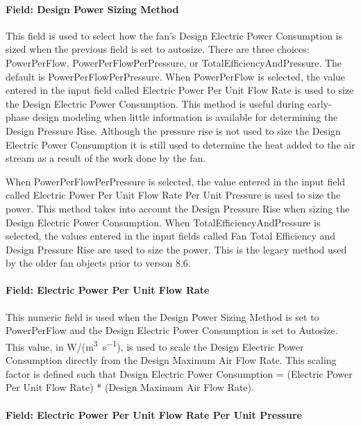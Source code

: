 \paragraph{Field: Design Power Sizing Method}

This field is used to select how the fan's Design Electric Power Consumption is sized when the previous field is set to autosize.  There are three choices: PowerPerFlow, PowerPerFlowPerPressure, or TotalEfficiencyAndPressure.  The default is PowerPerFlowPerPressure.
When PowerPerFlow is selected, the value entered in the input field called Electric Power Per Unit Flow Rate is used to size the Design Electric Power Consumption. This method is useful during early-phase design modeling when little information is available for determining the Design Pressure Rise.  Although the pressure rise is not used to size the Design Electric Power Consumption it is still used to determine the heat added to the air stream as a result of the work done by the fan.

When PowerPerFlowPerPressure is selected, the value entered in the input field called Electric Power Per Unit Flow Rate Per Unit Pressure is used to size the power. This method takes into account the Design Pressure Rise when sizing the Design Electric Power Consumption.
When TotalEfficiencyAndPressure is selected, the values entered in the input fields called Fan Total Efficiency and Design Pressure Rise are used to size the power. This is the legacy method used by the older fan objects prior to verson 8.6.

\paragraph{Field: Electric Power Per Unit Flow Rate}\label{field-power-per-unit-flow-fansysmodel}

This numeric field is used when the Design Power Sizing Method is set to PowerPerFlow and the Design Electric Power Consumption is set to Autosize. This value, in W/(\si{\m\cubed\per\s}), is used to scale the Design Electric Power Consumption directly from the Design Maximum Air Flow Rate. This scaling factor is defined such that Design Electric Power Consumption = (Electric Power Per Unit Flow Rate) * (Design Maximum Air Flow Rate).

\paragraph{Field: Electric Power Per Unit Flow Rate Per Unit Pressure}\label{field-power-per-flow-per-pressure-fansysmodel}

